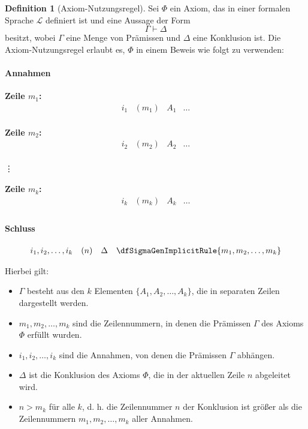 \documentclass{book}
\theoremstyle{plain}
\theoremstyle{remark}
\theoremstyle{definition}
\newtheorem{definition}{Definition}[section]
\begin{document}
\begin{definition}[Axiom-Nutzungsregel]
\label{dfSigmaGenImplicitRule}
Sei \(\Phi\) ein Axiom, das in einer formalen Sprache \(\mathcal{L}\) definiert ist und eine Aussage der Form 
\[
\Gamma \vdash \Delta
\]
besitzt, wobei \(\Gamma\) eine Menge von Prämissen und \(\Delta\) eine Konklusion ist. Die Axiom-Nutzungsregel erlaubt es, \(\Phi\) in einem Beweis wie folgt zu verwenden:

\paragraph{Annahmen}
\textbf{Zeile \(m_1\):}
\[
\begin{array}{llll}
   i_1& (m_1) & A_1 & \dots \\
\end{array}
\]

\textbf{Zeile \(m_2\):}
\[
\begin{array}{llll}
   i_2& (m_2) & A_2 & \dots \\
\end{array}
\]

\vdots

\textbf{Zeile \(m_k\):}
\[
\begin{array}{llll}
   i_k& (m_k) & A_k & \dots \\
\end{array}
\]

\paragraph{Schluss}
\[
\begin{array}{llll}
   i_1, i_2, \ldots, i_k & (n) & \Delta & \dfSigmaGenImplicitRule{m_1,m_2,\dots,m_k} \\
\end{array}
\]

Hierbei gilt:
\begin{itemize}
    \item \( \Gamma \) besteht aus den \( k \) Elementen \( \{A_1, A_2, \ldots, A_k\} \), die in separaten Zeilen dargestellt werden.
    \item \( m_1, m_2, \ldots, m_k \) sind die Zeilennummern, in denen die Prämissen \( \Gamma \) des Axioms \(\Phi\) erfüllt wurden.
    \item \( i_1, i_2, \ldots, i_k \) sind die Annahmen, von denen die Prämissen \( \Gamma \) abhängen.
    \item \( \Delta \) ist die Konklusion des Axioms \(\Phi\), die in der aktuellen Zeile \( n \) abgeleitet wird.
    \item \( n > m_k \) für alle \( k \), d. h. die Zeilennummer \( n \) der Konklusion ist größer als die Zeilennummern \( m_1, m_2, \ldots, m_k \) aller Annahmen.
\end{itemize}
\end{definition}
\end{document}
